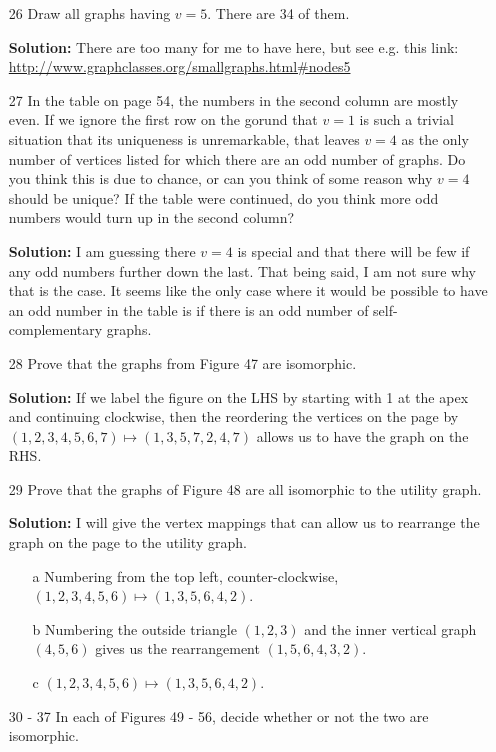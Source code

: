 \documentclass{article}
\begin{document}
\begin{enumerate}
\item[26] Draw all graphs having $v = 5$. There are 34 of them.

\textbf{Solution:} There are too many for me to have here, but see e.g. this link: \url{http://www.graphclasses.org/smallgraphs.html#nodes5}

\item[27] In the table on page 54, the numbers in the second column are mostly even. If we ignore the first row on the gorund that $v = 1$ is such a trivial situation that its uniqueness is unremarkable, that leaves $v = 4$ as the only number of vertices listed for which there are an odd number of graphs. Do you think this is due to chance, or can you think of some reason why $v = 4$ should be unique? If the table were continued, do you think more odd numbers would turn up in the second column?

\textbf{Solution:} I am guessing there $v = 4$ is special and that there will be few if any odd numbers further down the last. That being said, I am not sure why that is the case. It seems like the only case where it would be possible to have an odd number in the table is if there is an odd number of self-complementary graphs.

\item[28] Prove that the graphs from Figure 47 are isomorphic.

\textbf{Solution:} If we label the figure on the LHS by starting with 1 at the apex and continuing clockwise, then the reordering the vertices on the page by $(1, 2, 3, 4, 5, 6, 7) \mapsto (1, 3, 5, 7, 2, 4, 7)$ allows us to have the graph on the RHS.

\item[29] Prove that the graphs of Figure 48 are all isomorphic to the utility graph.

\textbf{Solution:} I will give the vertex mappings that can allow us to rearrange the graph on the page to the utility graph.
\begin{enumerate}
\item[a] Numbering from the top left, counter-clockwise, $(1, 2, 3, 4, 5, 6) \mapsto (1, 3, 5, 6, 4, 2)$.
\item[b] Numbering the outside triangle $(1, 2, 3)$ and the inner vertical graph $(4, 5, 6)$ gives us the rearrangement $(1, 5, 6, 4, 3, 2)$.
\item[c] $(1, 2, 3, 4, 5, 6) \mapsto (1, 3, 5, 6, 4, 2)$.
\end{enumerate}

\item[30 - 37] In each of Figures 49 - 56, decide whether or not the two are isomorphic.


\end{enumerate}
\end{document}
